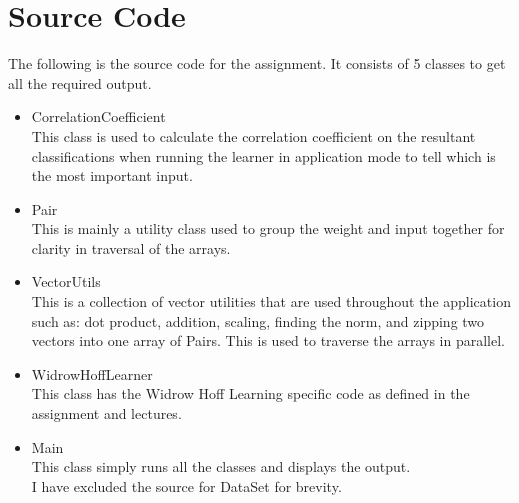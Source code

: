 \section{ Source Code }
The following is the source code for the assignment.  It consists of 5 classes to get all the required output. 
\begin{itemize}
	\item CorrelationCoefficient \\
		This class is used to calculate the correlation coefficient on the resultant classifications when running the learner in application mode to tell which is the most important input.
	\item Pair \\
		This is mainly a utility class used to group the weight and input together for clarity in traversal of the arrays.
	\item VectorUtils \\
		This is a collection of vector utilities that are used throughout the application such as: dot product, addition, scaling, finding the norm, and zipping two vectors into one array of Pairs.  This is used to traverse the arrays in parallel.
	\item WidrowHoffLearner \\
		This class has the Widrow Hoff Learning specific code as defined in the assignment and lectures.
	\item Main \\
		This class simply runs all the classes and displays the output. \\
		
		I have excluded the source for DataSet for brevity.
\end{itemize}
